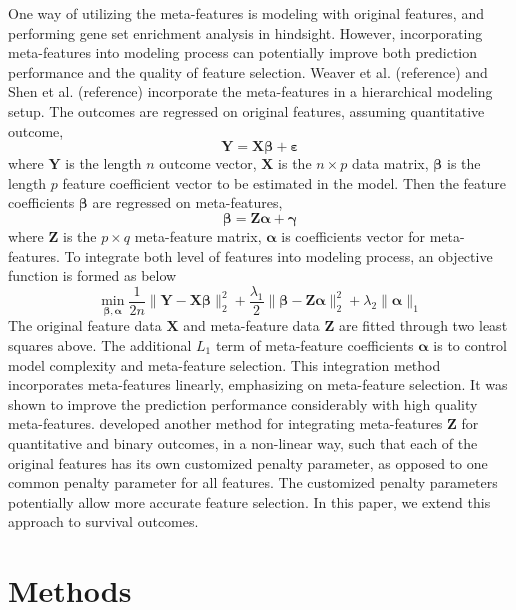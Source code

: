 \documentclass[12pt]{article}
\begin{document}
One way of utilizing the meta-features is modeling with original features, and performing gene set enrichment analysis \citep{subramanian2005gene} in hindsight. However, incorporating meta-features into modeling process can potentially improve both prediction performance and the quality of feature selection. Weaver et al. (reference) and Shen et al. (reference) incorporate the meta-features in a hierarchical modeling setup. The outcomes are regressed on original features, assuming quantitative outcome, 
$$ \bm{Y} = \bm{X\beta} + \bm{\varepsilon} $$ 
where $\bm{Y}$ is the length $n$ outcome vector, $\bm{X}$ is the $n \times p$ data matrix, $\bm{\beta}$ is the length $p$ feature coefficient vector to be estimated in the model. Then the feature coefficients $\bm{\beta}$ are regressed on meta-features,
$$ \bm{\beta} = \bm{Z\alpha} + \bm{\gamma} $$
where $\bm{Z}$ is the $p \times q$ meta-feature matrix, $\bm{\alpha}$ is coefficients vector for meta-features. To integrate both level of features into modeling process, an objective function is formed as below 
$$ \min_{\bm{\beta, \alpha}} \frac{1}{2n} \|\bm{Y}-\bm{X \beta} \|_2^2 + \frac{\lambda_1}{2} \|\bm{\beta} - \bm{Z \alpha} \|_2^2 + \lambda_2 \|\bm{\alpha}\|_1 $$
The original feature data $\bm{X}$ and meta-feature data $\bm{Z}$ are fitted through two least squares above. The additional $L_1$ term of meta-feature coefficients $\bm{\alpha}$ is to control model complexity and meta-feature selection. This integration method incorporates meta-features linearly, emphasizing on meta-feature selection. It was shown to improve the prediction performance considerably with high quality meta-features. \cite{10.1093/bioinformatics/btaa776} developed another method for integrating meta-features $\bm{Z}$ for quantitative and binary outcomes, in a non-linear way, such that each of the original features has its own customized penalty parameter, as opposed to one common penalty parameter for all features. The customized penalty parameters potentially allow more accurate feature selection. In this paper, we extend this approach to survival outcomes. 

\section{Methods}
\label{sec:meth}
\end{document}
